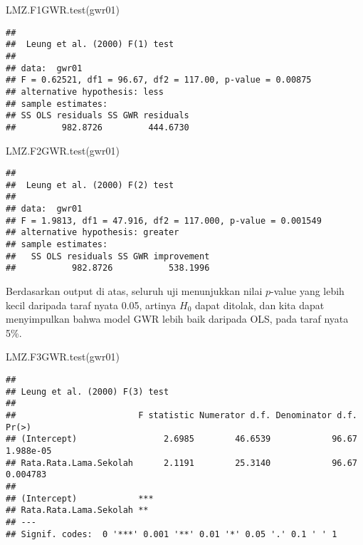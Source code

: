 \documentclass[
]{book}
\newenvironment{Shaded}{\begin{snugshade}}{\end{snugshade}}
\newcommand{\FunctionTok}[1]{\textcolor[rgb]{0.00,0.00,0.00}{#1}}
\newcommand{\NormalTok}[1]{#1}
\begin{document}
\begin{Shaded}
\begin{Highlighting}[]
\FunctionTok{LMZ.F1GWR.test}\NormalTok{(gwr01)}
\end{Highlighting}
\end{Shaded}

\begin{verbatim}
## 
##  Leung et al. (2000) F(1) test
## 
## data:  gwr01
## F = 0.62521, df1 = 96.67, df2 = 117.00, p-value = 0.00875
## alternative hypothesis: less
## sample estimates:
## SS OLS residuals SS GWR residuals 
##         982.8726         444.6730
\end{verbatim}

\begin{Shaded}
\begin{Highlighting}[]
\FunctionTok{LMZ.F2GWR.test}\NormalTok{(gwr01)}
\end{Highlighting}
\end{Shaded}

\begin{verbatim}
## 
##  Leung et al. (2000) F(2) test
## 
## data:  gwr01
## F = 1.9813, df1 = 47.916, df2 = 117.000, p-value = 0.001549
## alternative hypothesis: greater
## sample estimates:
##   SS OLS residuals SS GWR improvement 
##           982.8726           538.1996
\end{verbatim}

Berdasarkan output di atas, seluruh uji menunjukkan nilai \(p\)-value yang lebih kecil daripada taraf nyata 0.05, artinya \(H_0\) dapat ditolak, dan kita dapat menyimpulkan bahwa model GWR lebih baik daripada OLS, pada taraf nyata 5\%.

\begin{Shaded}
\begin{Highlighting}[]
\FunctionTok{LMZ.F3GWR.test}\NormalTok{(gwr01)}
\end{Highlighting}
\end{Shaded}

\begin{verbatim}
## 
## Leung et al. (2000) F(3) test
## 
##                        F statistic Numerator d.f. Denominator d.f.     Pr(>)
## (Intercept)                 2.6985        46.6539            96.67 1.988e-05
## Rata.Rata.Lama.Sekolah      2.1191        25.3140            96.67  0.004783
##                           
## (Intercept)            ***
## Rata.Rata.Lama.Sekolah ** 
## ---
## Signif. codes:  0 '***' 0.001 '**' 0.01 '*' 0.05 '.' 0.1 ' ' 1
\end{verbatim}
\end{document}
